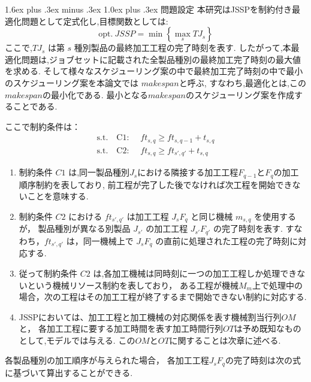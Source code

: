 \documentclass{jarticle}
\makeatletter
\renewcommand{\subsection}{%
  \@startsection{subsection}{2}{\z@}%
  {1.6ex plus .3ex minus .3ex}%
  {1.0ex plus .3ex}%
  {\LARGE\bfseries}%
}
\makeatother
\begin{document}
\subsection{問題設定}
本研究はJSSPを制約付き最適化問題として定式化し,目標関数としては:\\
\begin{equation}
\mathrm{opt.}\ JSSP = \min \left\{ \max_{s} TJ_{s} \right\}
\label{eq:objective}
\end{equation}
ここで,$TJ_s$ は第 $s$ 種別製品の最終加工工程の完了時刻を表す.
したがって,本最適化問題は,ジョブセットに記載された全製品種別の最終加工完了時刻の最大値を求める.
そして様々なスケジューリング案の中で最終加工完了時刻の中で最小のスケジューリング案を本論文では $makespan$と呼ぶ,
すなわち,最適化とは,この$makespan$の最小化である.
最小となる$makespan$のスケジューリング案を作成することである.

ここで制約条件は：
\begin{align}
\text{s.t.}\quad \text{C1: }\ 
& ft_{s,q} \ge ft_{s,q-1} + t_{s,q}
\label{cond:C1} \\[6pt]
\text{s.t.}\quad \text{C2: }\ 
& ft_{s,q} \ge ft_{s',q'} + t_{s,q}
\label{cond:C2}
\end{align}

\begin{enumerate}
     \item 制約条件 $C1$ は,同一製品種別$J_s$における隣接する加工工程$F_{q-1}$と$F_q$の加工順序制約を表しており,
     前工程が完了した後でなければ次工程を開始できないことを意味する.
     \item 制約条件 $C2$ における $ft_{s',q'}$ は加工工程 $J_sF_q$ と同じ機械 $m_{s,q}$ を使用するが，
     製品種別が異なる別製品 $J_{s'}$ の加工工程 $J_{s'}F_{q'}$ の完了時刻を表す.
     すなわち，$ft_{s',q'}$ は，同一機械上で $J_sF_q$ の直前に処理された工程の完了時刻に対応する.
     \item 従って制約条件 $C2$ は,各加工機械は同時刻に一つの加工工程しか処理できないという機械リソース制約を表しており，
     ある工程が機械$M_m$上で処理中の場合，次の工程はその加工工程が終了するまで開始できない制約に対応する.
     \item JSSPにおいては、加工工程と加工機械の対応関係を表す機械割当行列$OM$と，
     各加工工程に要する加工時間を表す加工時間行列$OT$は予め既知なものとして,モデルでは与える.
     この$OM$と$OT$に関することは次章に述べる.
    \end{enumerate}

各製品種別の加工順序が与えられた場合，
各加工工程$J_sF_q$の完了時刻は次の式に基づいて算出することができる.
\end{document}
